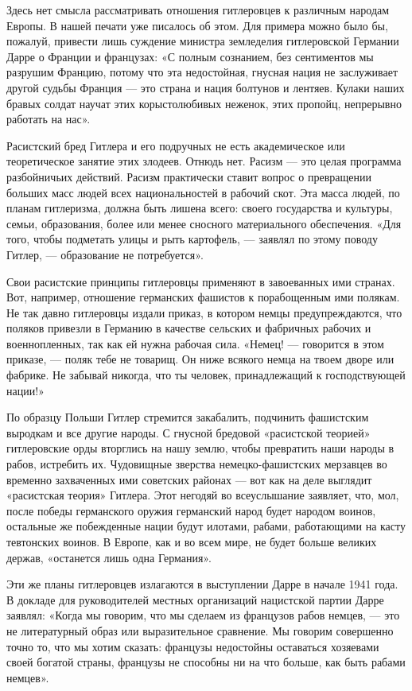 \documentclass[12pt, a4paper, openany]{book}
\begin{document}
Здесь нет смысла рассматривать отношения гитлеровцев к различным народам Европы. В нашей печати уже писалось об этом. Для примера можно было бы, пожалуй, привести лишь суждение министра земледелия гитлеровской Германии Дарре о Франции и французах: «С полным сознанием, без сентиментов мы разрушим Францию, потому что эта недостойная, гнусная нация не заслуживает другой судьбы Франция — это страна и нация болтунов и лентяев. Кулаки наших бравых солдат научат этих корыстолюбивых неженок, этих пропойц, непрерывно работать на нас».

Расистский бред Гитлера и его подручных не есть академическое или теоретическое занятие этих злодеев. Отнюдь нет. Расизм — это целая программа разбойничьих действий. Расизм практически ставит вопрос о превращении больших масс людей всех национальностей в рабочий скот. Эта масса людей, по планам гитлеризма, должна быть лишена всего: своего государства и культуры, семьи, образования, более или менее сносного материального обеспечения. «Для того, чтобы подметать улицы и рыть картофель, — заявлял по этому поводу Гитлер, — образование не потребуется».

Свои расистские принципы гитлеровцы применяют в завоеванных ими странах. Вот, например, отношение германских фашистов к порабощенным ими полякам. Не так давно гитлеровцы издали приказ, в котором немцы предупреждаются, что поляков привезли в Германию в качестве сельских и фабричных рабочих и военнопленных, так как ей нужна рабочая сила. «Немец! — говорится в этом приказе, — поляк тебе не товарищ. Он ниже всякого немца на твоем дворе или фабрике. Не забывай никогда, что ты человек, принадлежащий к господствующей нации!»

По образцу Польши Гитлер стремится закабалить, подчинить фашистским выродкам и все другие народы. С гнусной бредовой «расистской теорией» гитлеровские орды вторглись на нашу землю, чтобы превратить наши народы в рабов, истребить их. Чудовищные зверства немецко-фашистских мерзавцев во временно захваченных ими советских районах — вот как на деле выглядит «расистская теория» Гитлера. Этот негодяй во всеуслышание заявляет, что, мол, после победы германского оружия германский народ будет народом воинов, остальные же побежденные нации будут илотами, рабами, работающими на касту тевтонских воинов. В Европе, как и во всем мире, не будет больше великих держав, «останется лишь одна Германия».

Эти же планы гитлеровцев излагаются в выступлении Дарре в начале 1941 года. В докладе для руководителей местных организаций нацистской партии Дарре заявлял: «Когда мы говорим, что мы сделаем из французов рабов немцев, — это не литературный образ или выразительное сравнение. Мы говорим совершенно точно то, что мы хотим сказать: французы недостойны оставаться хозяевами своей богатой страны, французы не способны ни на что больше, как быть рабами немцев».
\end{document}
